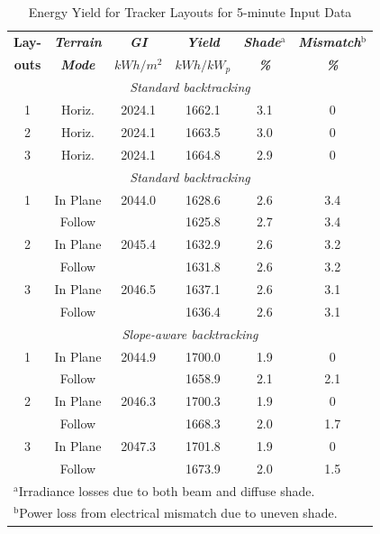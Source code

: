 \documentclass[conference]{IEEEtran}
\begin{document}
\begin{table}[htbp]
\caption{Energy Yield for Tracker Layouts for 5-minute Input Data}
\begin{center}
\begin{tabular}{|c|c|c|c|c|c|}
\hline
\textbf{Lay-}& \textbf{\textit{Terrain}}& \textbf{\textit{GI}}& \textbf{\textit{Yield}}& \textbf{\textit{Shade$^{\mathrm{a}}$}}& \textbf{\textit{Mismatch$^{\mathrm{b}}$}} \\
\textbf{outs}& \textbf{\textit{Mode}}& \textbf{\textit{$kWh/m^2$}}& \textbf{\textit{$kWh / kW_p$}}& \textbf{\textit{\%}}& \textbf{\textit{\%}} \\
\hline
\multicolumn{6}{|c|}{\textit{Standard backtracking}} \\
\hline
1& Horiz.& 2024.1&  1662.1& 3.1& 0 \\
\hline
2& Horiz.& 2024.1&  1663.5& 3.0& 0 \\
 \hline
3& Horiz.& 2024.1&  1664.8& 2.9& 0 \\
\hline
\multicolumn{6}{|c|}{\textit{Standard backtracking}} \\
\hline
1& In Plane& 2044.0&  1628.6& 2.6& 3.4 \\
 & Follow&         &  1625.8& 2.7& 3.4 \\
\hline
2& In Plane& 2045.4&  1632.9& 2.6& 3.2 \\
 & Follow&         &  1631.8& 2.6& 3.2 \\
\hline
3& In Plane& 2046.5&  1637.1& 2.6& 3.1 \\
 & Follow&         &  1636.4& 2.6& 3.1 \\
\hline
\multicolumn{6}{|c|}{\textit{Slope-aware backtracking}} \\
\hline
1& In Plane& 2044.9&  1700.0& 1.9& 0 \\
 & Follow&         &  1658.9& 2.1& 2.1 \\
\hline
2& In Plane& 2046.3&  1700.3& 1.9& 0 \\
 & Follow&         &  1668.3& 2.0& 1.7 \\
\hline
3& In Plane& 2047.3&  1701.8& 1.9& 0 \\
 & Follow&         &  1673.9& 2.0& 1.5 \\
\hline
\multicolumn{6}{l}{$^{\mathrm{a}}$Irradiance losses due to both beam and diffuse shade.} \\
\multicolumn{6}{l}{$^{\mathrm{b}}$Power loss from electrical mismatch due to uneven shade.}
\end{tabular}
\label{table:energy-5min}
\end{center}
\end{table}
\end{document}
